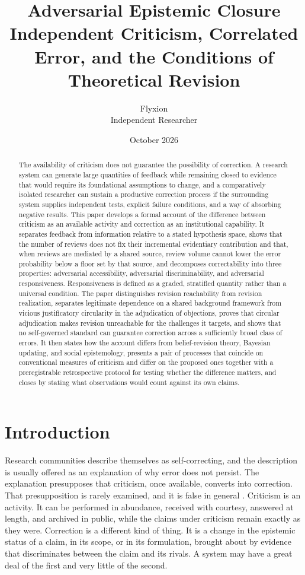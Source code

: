 \documentclass[11pt]{article}
\title{Adversarial Epistemic Closure\\[0.4em]
\large Independent Criticism, Correlated Error, and the Conditions of Theoretical Revision}
\author{Flyxion\\Independent Researcher}
\date{October 2026}
\theoremstyle{remark}
\begin{document}
\maketitle

\begin{abstract}
\noindent
The availability of criticism does not guarantee the possibility of correction. A research system can generate large quantities of feedback while remaining closed to evidence that would require its foundational assumptions to change, and a comparatively isolated researcher can sustain a productive correction process if the surrounding system supplies independent tests, explicit failure conditions, and a way of absorbing negative results. This paper develops a formal account of the difference between criticism as an available activity and correction as an institutional capability. It separates feedback from information relative to a stated hypothesis space, shows that the number of reviews does not fix their incremental evidentiary contribution and that, when reviews are mediated by a shared source, review volume cannot lower the error probability below a floor set by that source, and decomposes correctability into three properties: adversarial accessibility, adversarial discriminability, and adversarial responsiveness. Responsiveness is defined as a graded, stratified quantity rather than a universal condition. The paper distinguishes revision reachability from revision realization, separates legitimate dependence on a shared background framework from vicious justificatory circularity in the adjudication of objections, proves that circular adjudication makes revision unreachable for the challenges it targets, and shows that no self-governed standard can guarantee correction across a sufficiently broad class of errors. It then states how the account differs from belief-revision theory, Bayesian updating, and social epistemology, presents a pair of processes that coincide on conventional measures of criticism and differ on the proposed ones together with a preregistrable retrospective protocol for testing whether the difference matters, and closes by stating what observations would count against its own claims.
\end{abstract}

\section{Introduction}

Research communities describe themselves as self-correcting, and the description is usually offered as an explanation of why error does not persist. The explanation presupposes that criticism, once available, converts into correction. That presupposition is rarely examined, and it is false in general \cite{ioannidis2012}. Criticism is an activity. It can be performed in abundance, received with courtesy, answered at length, and archived in public, while the claims under criticism remain exactly as they were. Correction is a different kind of thing. It is a change in the epistemic status of a claim, in its scope, or in its formulation, brought about by evidence that discriminates between the claim and its rivals. A system may have a great deal of the first and very little of the second.
\end{document}
